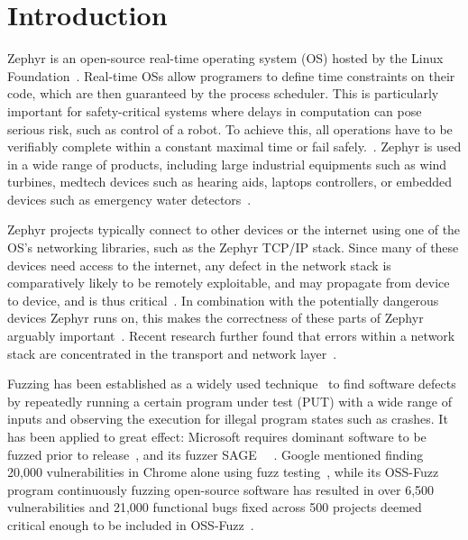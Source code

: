 \documentclass[twocolumn]{article}
\let\savedCite=\cite
\renewcommand{\cite}{\unskip~\savedCite}
\begin{document}
\clearpage\newpage
\onecolumn

\tableofcontents
\clearpage\newpage
\twocolumn
{}


\section{Introduction}
\label{Introduction}

Zephyr is an open-source real-time operating system (OS) hosted by the Linux Foundation\cite{ZephyrAbout}. Real-time OSs allow programers to define time constraints on their code, which are then guaranteed by the process scheduler. This is particularly important for safety-critical systems where delays in computation can pose serious risk, such as control of a robot. To achieve this, all operations have to be verifiably complete within a constant maximal time or fail safely.\cite{RTOSWiki}. Zephyr is used in a wide range of products, including large industrial equipments such as wind turbines, medtech devices such as hearing aids, laptops controllers, or embedded devices such as emergency water detectors\cite{ZephyrUsedIn}.

Zephyr projects typically connect to other devices or the internet using one of the OS's networking libraries, such as the Zephyr TCP/IP stack. Since many of these devices need access to the internet, any defect in the network stack is comparatively likely to be remotely exploitable, and may propagate from device to device, and is thus critical\cite{Fuzzware}. In combination with the potentially dangerous devices Zephyr runs on, this makes the correctness of these parts of Zephyr arguably important\cite{Tardis}. Recent research further found that errors within a network stack are concentrated in the transport and network layer\cite{NetworkBugsReview}.

Fuzzing has been established as a widely used technique\cite{Demystifying} to find software defects by repeatedly running a certain program under test (PUT) with a wide range of inputs and observing the execution for illegal program states such as crashes. It has been applied to great effect: Microsoft requires dominant software to be fuzzed prior to release\cite{Demystifying}, and its fuzzer SAGE\cite{SAGE} \cite{FuzzingTheStateOfTheArt}. Google mentioned finding 20,000 vulnerabilities in Chrome alone using fuzz testing\cite{Demystifying}, while its OSS-Fuzz program continuously fuzzing open-source software has resulted in over 6,500 vulnerabilities and 21,000 functional bugs fixed across 500 projects deemed critical enough to be included in OSS-Fuzz\cite{ClusterFuzzLite}.
\end{document}

